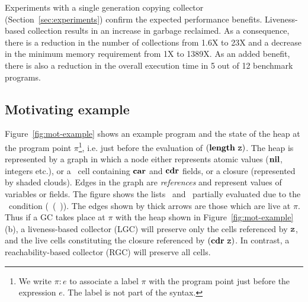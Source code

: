 \documentclass[9pt]{sigplanconf}
\begin{document}
Experiments    with   a    single    generation   copying    collector
(Section~\ref{sec:experiments})   confirm  the   expected  performance
benefits.  Liveness-based collection results in an increase in garbage
reclaimed.  As  a consequence, there is  a reduction in the  number of
collections from 1.6X  to 23X and a decrease  in the minimum
memory requirement from  1X to 1389X.  As  an added benefit,
there is also a reduction in the overall execution time in 5 out of 12
benchmark programs.
 

\subsection{Motivating example}
\label{sec:motiv}
   Figure~\ref{fig:mot-example}   shows  an   example
program and the state of the heap at the program point $\pi$\footnote{We write
$\pi\!:\!e$ to  associate a  label $\pi$ with  the program  point just
before  the  expression  $e$. The label is not part of the syntax.},  i.e. just  before  the  evaluation  of
$(\mathbf{length}\ \mbox{\tt z})$.  The heap is represented  by a graph in which a node
either  represents  atomic  values   ($\mbox{$\mathbf{ nil}$}$,  integers  etc.),  or  a
\CONS\  cell  containing  $\mbox{$\mathbf{car}$}$  and  $\mbox{$\mathbf{cdr}$}$  fields,  or  a  closure
(represented  by  shaded  clouds).   Edges   in  the  graph  are  {\em
  references} and represent values of variables or fields.  The figure
shows the  lists \px\  and \pz\  partially evaluated  due to  the
\SIF\ condition 
(\NULLQ~(\CAR~\pz)).
The edges  shown by thick  arrows are those  which are live  at $\pi$.
Thus if a GC takes  place at $\pi$ with the heap shown
in Figure~\ref{fig:mot-example}(b),  a liveness-based  collector (LGC)
will preserve only  the cells referenced by $\mbox{\tt z}$, and  the live cells
constituting the  closure referenced by $(\mbox{$\mathbf{cdr}$}~\mbox{\tt z})$.   In contrast, a
reachability-based collector (RGC) will preserve all cells.
\end{document}
